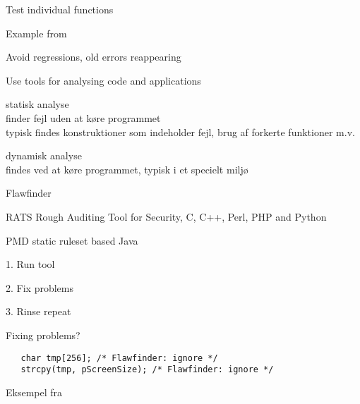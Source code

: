 \documentclass[Screen16to9,17pt]{foils}
\begin{document}
\begin{list1}
\item Test individual functions
\item Example from 
\item Avoid regressions, old errors reappearing
\end{list1}



\centerline{Use tools for analysing code and applications}


\begin{list1}
\item  {\Large statisk analyse}\\
finder fejl uden at køre programmet\\
typisk findes konstruktioner som indeholder fejl, brug af forkerte funktioner m.v.
\item {\Large dynamisk analyse}\\
findes ved at køre programmet, typisk i et specielt miljø
\end{list1}

\begin{list1}
\item Flawfinder 
\item RATS Rough Auditing Tool for Security, C, C++, Perl, PHP and Python
\item PMD static ruleset based Java
\item {\small {}}
\end{list1}


\begin{list1}
\item 1. Run tool
\item 2. Fix problems
\item 3. Rinse repeat
\end{list1}

Fixing problems?\\
\begin{verbatim}
   char tmp[256]; /* Flawfinder: ignore */
   strcpy(tmp, pScreenSize); /* Flawfinder: ignore */
\end{verbatim}
Eksempel fra 







\end{document}

